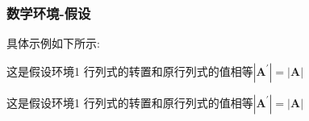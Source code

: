 \subsubsection{数学环境-假设}
具体示例如下所示:
\begin{tcblisting}{}
\begin{assumption}[类型二]
    这是假设环境1 行列式的转置和原行列式的值相等$\left|\boldsymbol{A}^{\prime}\right|=|\boldsymbol{A}|$
\end{assumption}
\end{tcblisting}
\begin{assumption}[类型二]
    这是假设环境1 行列式的转置和原行列式的值相等$\left|\boldsymbol{A}^{\prime}\right|=|\boldsymbol{A}|$
\end{assumption}
%    
%
